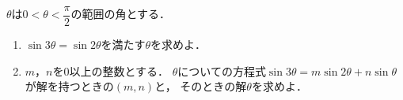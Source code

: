 \documentclass[../../main.tex]{subfiles}
\begin{document}
$\theta$は$\displaystyle 0<\theta<\dfrac{\pi}{2}$の範囲の角とする．
\begin{enumerate}
  \item $\sin3\theta=\sin2\theta$を満たす$\theta$を求めよ．
  \item $m$，$n$を0以上の整数とする．
    $\theta$についての方程式$\sin3\theta=m\sin2\theta+n\sin\theta$が解を持つときの$(m,n)$と，
    そのときの解$\theta$を求めよ．
\end{enumerate}
\end{document}
